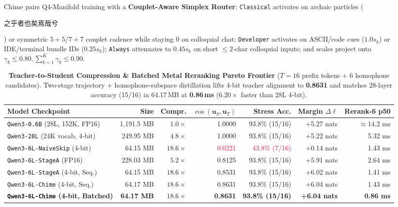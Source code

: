 \documentclass[10pt,twocolumn,letterpaper]{article}
\newcommand{\zh}[1]{\begin{CJK*}{UTF8}{gbsn}{\small #1}\end{CJK*}}
\newcommand{\zh}[1]{#1}
\begin{document}
Chime pairs Q4-Manifold training with a \textbf{Couplet-Aware Simplex Router}: \texttt{Classical} activates on archaic particles (\zh{之乎者也矣焉哉兮}) or symmetric $5+5$/$7+7$ couplet cadence while staying $0$ on colloquial chat; \texttt{Developer} activates on ASCII/code cues ($1.0 s_k$) or IDE/terminal bundle IDs ($0.25 s_k$); \texttt{Always} attenuates to $0.45 s_k$ on short $\le 2$-char colloquial inputs; and scales project onto $\gamma_k \le 0.80, \sum_{k=1}^K \gamma_k \le 0.90$.

\begin{table}[t]
  \centering
  {\small
  \setlength{\tabcolsep}{4.8pt}
  \begin{tabular*}{\textwidth}{@{\extracolsep{\fill}}lrrrrrr@{}}
    \toprule
    \textbf{Model Checkpoint} & \textbf{Size} & \textbf{Compr.} & $\cos(\bm{u}_S, \bm{u}_T)$ & \textbf{Stress Acc.} & \textbf{Margin $\Delta\ell$} & \textbf{Rerank-6 p50} \\
    \midrule
    \texttt{Qwen3-0.6B} (28L, 152K, FP16) & 1,191.5 MB & $1.0\times$ & 1.0000 & 93.8\% (15/16) & +5.27 nats & $\approx 14.2$ ms \\
    \texttt{Qwen3-28L} (24K vocab, 4-bit) & 249.95 MB & $4.8\times$ & 1.0000 & 93.8\% (15/16) & +5.22 nats & 5.32 ms \\
    \texttt{Qwen3-6L-NaiveSkip} (4-bit) & 64.15 MB & $18.6\times$ & \textcolor{crimson}{0.0221} & \textcolor{crimson}{43.8\% (7/16)} & +0.14 nats & 1.43 ms \\
    \texttt{Qwen3-6L-StageA} (FP16) & 228.03 MB & $5.2\times$ & 0.8125 & 93.8\% (15/16) & +5.91 nats & 2.64 ms \\
    \texttt{Qwen3-6L-StageA} (4-bit, Seq.) & 64.15 MB & $18.6\times$ & 0.8531 & 93.8\% (15/16) & +6.02 nats & 1.41 ms \\
    \texttt{Qwen3-6L-Chime} (4-bit, Seq.) & 64.17 MB & $18.6\times$ & 0.8631 & 93.8\% (15/16) & +6.04 nats & 1.43 ms \\
    \textbf{\texttt{Qwen3-6L-Chime} (4-bit, Batched)} & \textbf{64.17 MB} & $\bm{18.6\times}$ & \textbf{0.8631} & \textbf{93.8\% (15/16)} & \textbf{+6.04 nats} & \textbf{0.86 ms} \\
    \bottomrule
  \end{tabular*}%
  }
  \vspace{-0.3em}
  \caption{\textbf{Teacher-to-Student Compression \& Batched Metal Reranking Pareto Frontier} ($T=16$ prefix tokens + 6 homophone candidates). Two-stage trajectory + homophone-subspace distillation lifts 4-bit teacher alignment to \textbf{0.8631} and matches 28-layer accuracy (15/16) in 64.17\,MB at \textbf{0.86\,ms} ($6.20\times$ faster than 28L 4-bit).}
  \label{tab:pareto}
\end{table}
\end{document}
